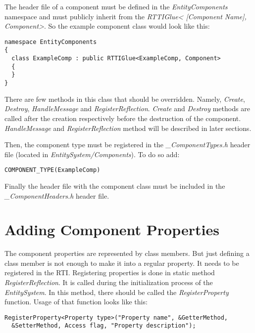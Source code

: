 \documentclass[a4paper, 12pt]{report}
\begin{document}
The header file of a component must be defined in the \emph{EntityComponents} namespace and must publicly inherit from the  \emph{RTTIGlue< [Component Name], Component>}. So the example component class would look like this:

\begin{verbatim}
namespace EntityComponents
{
  class ExampleComp : public RTTIGlue<ExampleComp, Component>
  {
  }
}
\end{verbatim}

There are few methods in this class that should be overridden. Namely, \emph{Create}, \emph{Destroy}, \emph{HandleMessage} and \emph{RegisterReflection}. \emph{Create} and \emph{Destroy} methods are called after the creation respectively before the destruction of the component. \emph{HandleMessage} and \emph{RegisterReflection} method will be described in later sections.

Then, the component type must be registered in the \emph{\_ComponentTypes.h} header file (located in \emph{EntitySystem/Components}). To do so add:
\begin{verbatim}
COMPONENT_TYPE(ExampleComp)
\end{verbatim}

Finally the header file with the component class must be included in the \emph{\_ComponentHeaders.h} header file.

\section{Adding Component Properties}

The component properties are represented by class members. But just defining a class member is not enough to make it into a regular property. It needs to be registered in the RTI. Registering properties is done in static method \emph{RegisterReflection}. It is called during the initialization process of the \emph{EntitySystem}. In this method, there should be called the \emph{RegisterProperty} function. Usage of that function looks like this:

\begin{verbatim}
RegisterProperty<Property type>("Property name", &GetterMethod, 
  &SetterMethod, Access flag, "Property description");
\end{verbatim}
\end{document}
